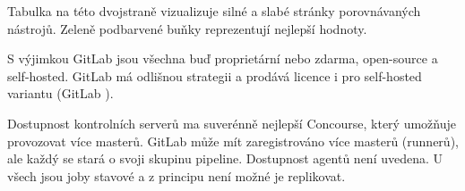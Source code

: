 
    Tabulka na této dvojstraně vizualizuje silné a slabé stránky porovnávaných \CI nástrojů. Zeleně podbarvené buňky reprezentují nejlepší hodnoty.

    S výjimkou GitLab jsou všechna \CI buď proprietární  nebo zdarma, open-source a self-hosted. GitLab má odlišnou strategii a prodává licence i pro self-hosted variantu (GitLab ).

    Dostupnost kontrolních serverů ma suverénně nejlepší Concourse, který umožňuje provozovat více masterů. GitLab může mít zaregistrováno více masterů (runnerů), ale každý se stará o svoji skupinu pipeline. Dostupnost agentů není uvedena. U všech \CI jsou joby stavové a z principu není možné je replikovat.

